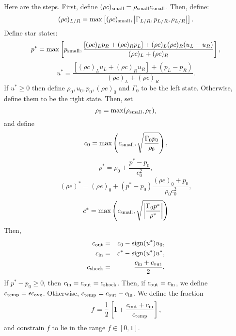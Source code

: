 Here are the steps.  First, define $(\rho c)_{\rm small} = \rho_{\rm
  small}c_{\rm small}$. Then, define:
\begin{equation}
(\rho c)_{L/R} = \max\left[(\rho c)_{\rm small},\left|\Gamma_{L/R},p_{L/R},\rho_{L/R}\right|\right].
\end{equation}
Define star states:
\begin{equation}
p^* = \max\left[p_{\rm small},\frac{\left[(\rho c)_L p_R + (\rho c)_R p_L\right] + (\rho c)_L(\rho c)_R(u_L-u_R)}{(\rho c)_L + (\rho c)_R}\right],
\end{equation}
\begin{equation}
u^* = \frac{\left[(\rho c)_L u_L + (\rho c)_R u_R\right]+ (p_L - p_R)}{(\rho c)_L + (\rho c)_R}.
\end{equation}
If $u^* \ge 0$ then define $\rho_0, u_0, p_0, (\rho e)_0$ and $\Gamma_0$ to be the left state.  Otherwise, define them to be the right state.  Then, set
\begin{equation}
\rho_0 = \max(\rho_{\rm small},\rho_0),
\end{equation}
and define
\begin{equation}
c_0 = \max\left(c_{\rm small},\sqrt{\frac{\Gamma_0 p_0}{\rho_0}}\right),
\end{equation}
\begin{equation}
\rho^* = \rho_0 + \frac{p^* - p_0}{c_0^2},
\end{equation}
\begin{equation}
(\rho e)^* = (\rho e)_0 + (p^* - p_0)\frac{(\rho e)_0 + p_0}{\rho_0 c_0^2},
\end{equation}
\begin{equation}
c^* = \max\left(c_{\rm small},\sqrt{\left|\frac{\Gamma_0 p^*}{\rho^*}\right|}\right)
\end{equation}
Then,
\begin{eqnarray}
c_{\rm out} &=& c_0 - {\rm sign}(u^*)u_0, \\
c_{\rm in} &=& c^* - {\rm sign}(u^*)u^*, \\
c_{\rm shock} &=& \frac{c_{\rm in} + c_{\rm out}}{2}.
\end{eqnarray}
If $p^* - p_0 \ge 0$, then $c_{\rm in} = c_{\rm out} = c_{\rm shock}$.
Then, if $c_{\rm out} = c_{\rm in}$, we define $c_{\rm temp} =
\epsilon c_{\rm avg}$.  Otherwise, $c_{\rm temp} = c_{\rm out} -
c_{\rm in}$.  We define the fraction
\begin{equation}
f = \frac{1}{2}\left[1 + \frac{c_{\rm out} + c_{\rm in}}{c_{\rm temp}}\right],
\end{equation}
and constrain $f$ to lie in the range $f\in[0,1]$.

